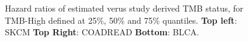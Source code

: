 \documentclass[12pt]{article}
\begin{document}
\begin{figure}[h]
    \caption{Hazard ratios of estimated verus study derived TMB status, for TMB-High defined at 25\%, 50\% and 75\% quantiles. \textbf{Top left}: SKCM \textbf{Top Right}: COADREAD \textbf{Bottom}: BLCA.}
    \label{fig:msk_forests}
\end{figure}
\end{document}
